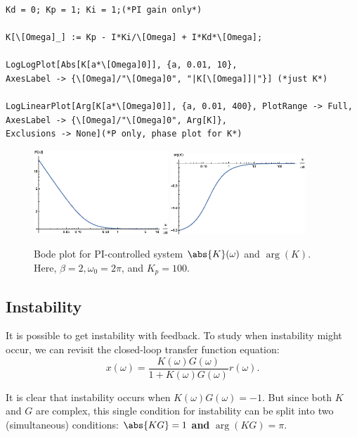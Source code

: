 \documentclass{article}
\theoremstyle{definition}
\newcommand{\f}[2]{\frac{#1}{#2}}
\begin{document}
\begin{lstlisting}
Kd = 0; Kp = 1; Ki = 1;(*PI gain only*)

K[\[Omega]_] := Kp - I*Ki/\[Omega] + I*Kd*\[Omega];

LogLogPlot[Abs[K[a*\[Omega]0]], {a, 0.01, 10}, 
AxesLabel -> {\[Omega]/"\[Omega]0", "|K[\[Omega]]|"}] (*just K*)

LogLinearPlot[Arg[K[a*\[Omega]0]], {a, 0.01, 400}, PlotRange -> Full, 
AxesLabel -> {\[Omega]/"\[Omega]0", Arg[K]}, 
Exclusions -> None](*P only, phase plot for K*)
\end{lstlisting}


\begin{figure}[!htb]
	\centering
	\includegraphics[width=0.45\textwidth]{bode_13}
	\quad
	\includegraphics[width=0.45\textwidth]{bode_14}
	\caption{Bode plot for PI-controlled system $\abs{K}(\omega)$ and $\arg(K)$. Here, $\beta = 2,\omega_0 = 2\pi$, and $K_p = 100$.} %
	\label{fig:bode_7}
\end{figure}





\subsection{Instability}

It is possible to get instability with feedback. To study when instability might occur, we can revisit the closed-loop transfer function equation:
\begin{equation*}
x(\omega) = \f{K(\omega) G(\omega)}{1+ K(\omega)G(\omega)} r(\omega).
\end{equation*}

It is clear that instability occurs when $K(\omega)G(\omega) = -1$. But since both $K$ and $G$ are complex, this single condition for instability can be split into two (simultaneous) conditions: $\abs{KG} = 1$ \textbf{and} $\arg(KG) = \pi$. \\
\end{document}
